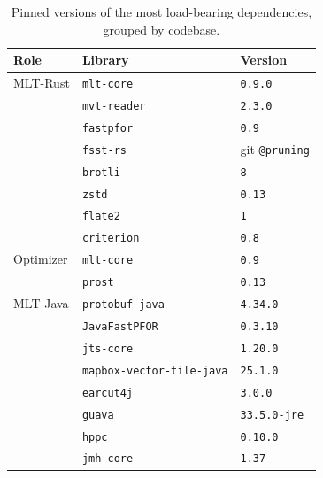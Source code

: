 \begin{table}[H]
\centering \small
\begin{tabular}{@{}l l l@{}}
\toprule
\textbf{Role} & \textbf{Library} & \textbf{Version} \\
\midrule
\acs{MLT}-Rust               & \texttt{mlt-core}                & \texttt{0.9.0} \\
                                       & \texttt{mvt-reader}              & \texttt{2.3.0} \\
                                       & \texttt{fastpfor}                & \texttt{0.9} \\
                                       & \texttt{fsst-rs}                 & git \texttt{@pruning} \\
                                       & \texttt{brotli}                  & \texttt{8} \\
                                       & \texttt{zstd}                    & \texttt{0.13} \\
                                       & \texttt{flate2}                  & \texttt{1} \\
                                       & \texttt{criterion}               & \texttt{0.8} \\
\midrule
Optimizer                    & \texttt{mlt-core}                & \texttt{0.9} \\
                                       & \texttt{prost}                   & \texttt{0.13} \\
\midrule
\ac{MLT}-Java                          & \texttt{protobuf-java}           & \texttt{4.34.0} \\
                                       & \texttt{JavaFastPFOR}            & \texttt{0.3.10} \\
                                       & \texttt{jts-core}                & \texttt{1.20.0} \\
                                       & \texttt{mapbox-vector-tile-java} & \texttt{25.1.0} \\
                                       & \texttt{earcut4j}                & \texttt{3.0.0} \\
                                       & \texttt{guava}                   & \texttt{33.5.0-jre} \\
                                       & \texttt{hppc}                    & \texttt{0.10.0} \\
                                       & \texttt{jmh-core}                & \texttt{1.37} \\
\bottomrule
\end{tabular}
\caption{
Pinned versions of the most load-bearing dependencies, grouped by codebase.}
\label{tab:bench_libs}
\end{table}

